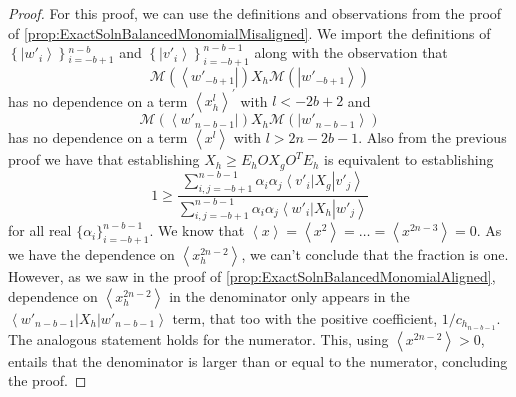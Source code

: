\documentclass{article}
\begin{document}
\begin{proof}
  For this proof, we can use the definitions and observations from the
  proof of \cref{prop:ExactSolnBalancedMonomialMisaligned}. We import
  the definitions of $\left\{ \left|w'_{i}\right\rangle \right\} {}_{i=-b+1}^{n-b}$
  and $\left\{ \left|v'_{i}\right\rangle \right\} _{i=-b+1}^{n-b-1}$
  along with the observation that
  \begin{displaymath}
    \mathcal{M}(\left\langle w'_{-b+1}\right|)X_{h}\mathcal{M}(\left|w'_{-b+1}\right\rangle )
  \end{displaymath}
  has no dependence on a term $\left\langle x_{h}^{l}\right\rangle ^{\prime}$
  with $l<-2b+2$
  and
  \begin{displaymath}
    \mathcal{M}(\left\langle w'_{n-b-1}\right|)X_{h}\mathcal{M}(\left|w'_{n-b-1}\right\rangle )
  \end{displaymath}
  has no dependence on a term $\left\langle x^{l}\right\rangle $ with
  $l>2n-2b-1$. Also from the previous
  proof we have that establishing $X_{h}\ge E_{h}OX_{g}O^{T}E_{h}$ is equivalent
  to establishing
  \begin{displaymath}
    1\ge\frac{\sum_{i,j=-b+1}^{n-b-1}\alpha_{i}\alpha_{j}\left\langle v'_{i}\right|X_{g}\left|v'_{j}\right\rangle }{\sum_{i,j=-b+1}^{n-b-1}\alpha_{i}\alpha_{j}\left\langle w'_{i}\right|X_{h}\left|w'_{j}\right\rangle }
  \end{displaymath}
  for all real $\{\alpha_{i}\}_{i=-b+1}^{n-b-1}$. We know that $\left\langle x\right\rangle =\left\langle x^{2}\right\rangle =\dots=\left\langle x^{2n-3}\right\rangle =0$.
  As we have the dependence on $\left\langle x_{h}^{2n-2}\right\rangle $,
  we can't conclude that the fraction is one. However, as we saw in
  the proof of \cref{prop:ExactSolnBalancedMonomialAligned}, dependence
  on $\left\langle x_{h}^{2n-2}\right\rangle $ in the denominator
  only appears in the $\left\langle w'_{n-b-1}\right|X_{h}\left|w'_{n-b-1}\right\rangle $
  term, that too with the positive coefficient, $1/c_{h_{n-b-1}}$.
  The analogous statement holds for the numerator. This, using $\left\langle x^{2n-2}\right\rangle >0$,
  entails that the denominator is larger than or equal to the numerator,
  concluding the proof.
\end{proof}
\end{document}
